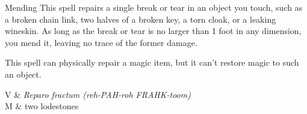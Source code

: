 \begin{Spell}[
  level=Cantrip,
  time=1 Minute,
  range=Touch,
  components={V, S, M},
  duration=Instantaneous,
  school=Transmutation,
  attack=None,
  effect=Utility
]{Mending}
This spell repairs a single break or tear in an object you touch, such as a broken chain link, two halves of a broken key, a torn cloak, or a leaking wineskin. As long as the break or tear is no larger than 1 foot in any dimension, you mend it, leaving no trace of the former damage.

This spell can physically repair a magic item, but it can't restore magic to such an object.

\begin{components}
V & \textit{Reparo fractum (reh-PAH-roh FRAHK-toom)} \\
M & two lodestones
\end{components}
\end{Spell}


